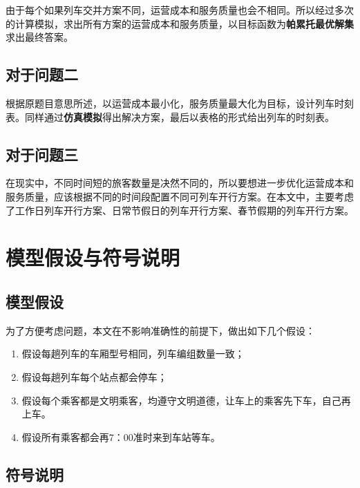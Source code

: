 由于每个如果列车交并方案不同，运营成本和服务质量也会不相同。所以经过多次的计算模拟，求出所有方案的运营成本和服务质量，以目标函数为\textbf{帕累托最优解集}求出最终答案。

\subsection{对于问题二}

根据原题目意思所述，以运营成本最小化，服务质量最大化为目标，设计列车时刻表。同样通过\textbf{仿真模拟}得出解决方案，最后以表格的形式给出列车的时刻表。

\subsection{对于问题三}

在现实中，不同时间短的旅客数量是决然不同的，所以要想进一步优化运营成本和服务质量，应该根据不同的时间段配置不同可列车开行方案。在本文中，主要考虑了工作日列车开行方案、日常节假日的列车开行方案、春节假期的列车开行方案。



%
%

\section{模型假设与符号说明}

\subsection{模型假设}

为了方便考虑问题，本文在不影响准确性的前提下，做出如下几个假设：

\begin{enumerate}
    \item 假设每趟列车的车厢型号相同，列车编组数量一致；
    \item 假设每趟列车每个站点都会停车；
    \item 假设每个乘客都是文明乘客，均遵守文明道德，让车上的乘客先下车，自己再上车。
    \item 假设所有乘客都会再7：00准时来到车站等车。
\end{enumerate}

\subsection{符号说明}

